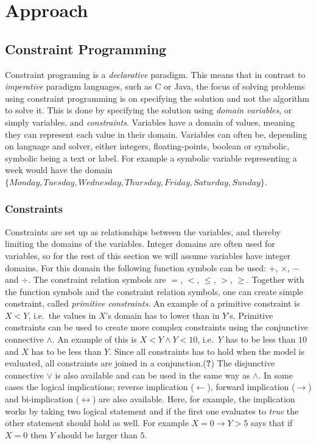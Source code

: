 \chapter{Approach}

\section{Constraint Programming}
Constraint programing is a \emph{declarative} paradigm. This means that in contrast to \emph{imperative} paradigm languages, such as C or Java, the focus of solving problems using constraint programming is on specifying the solution and not the algorithm to solve it. This is done by specifying the solution using \emph{domain variables}, or simply variables, and \emph{constraints}. Variables have a domain of values, meaning they can represent each value in their domain. Variables can often be, depending on language and solver, either integers, floating-points, boolean or symbolic, symbolic being a text or label. For example a symbolic variable representing a week would have the domain\\
$\{Monday,Tuesday, Wednesday, Thursday, Friday, Saturday, Sunday\}$.

\subsection{Constraints}
Constraints are set up as relationships between the variables, and thereby limiting the domains of the variables. Integer domains are often used for variables, so for the rest of this section we will assume variables have integer domains. For this domain the following function symbols can be used: $+$, $\times$, $-$ and $\div$. The constraint relation symbols are $=$, $<$, $\leq$, $>$, $\geq$. Together with the function symbols and the constraint relation symbols, one can create simple constraint, called \emph{primitive constraints}. An example of a primitive constraint is $X < Y$, i.e.\ the values in $X$'s domain has to lower than in $Y$'s. Primitive constraints can be used to create more complex constraints using the conjunctive connective $\land$. An example of this is $X < Y \land Y < 10$, i.e.\ $Y$ has to be less than $10$ and $X$ has to be less than $Y$. Since all constraints has to hold when the model is evaluated, all constraints are joined in a conjunction.(\textbf{?}) The disjunctive connective $\lor$ is also available and can be used in the same way as $\land$. In some cases the logical implications; reverse implication ($\gets$), forward implication ($\to$) and bi-implication ($\leftrightarrow$) are also available. Here, for example, the implication works by taking two logical statement and if the first one evaluates to \emph{true} the other statement should hold as well. For example $X = 0 \to Y > 5$ says that if $X=0$ then $Y$ should be larger than $5$.

